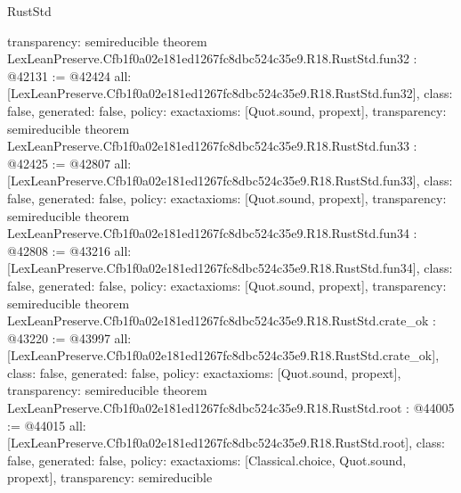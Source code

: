 \begin{lexlean}{RustStd}
\begin{coremodule}
{  transparency: semireducible
}
theorem LexLeanPreserve.Cfb1f0a02e181ed1267fc8dbc524c35e9.R18.RustStd.fun32 : @42131 := @42424 {
  all: [LexLeanPreserve.Cfb1f0a02e181ed1267fc8dbc524c35e9.R18.RustStd.fun32],
  class: false,
  generated: false,
  policy: exact{axioms: [Quot.sound, propext]},
  transparency: semireducible
}
theorem LexLeanPreserve.Cfb1f0a02e181ed1267fc8dbc524c35e9.R18.RustStd.fun33 : @42425 := @42807 {
  all: [LexLeanPreserve.Cfb1f0a02e181ed1267fc8dbc524c35e9.R18.RustStd.fun33],
  class: false,
  generated: false,
  policy: exact{axioms: [Quot.sound, propext]},
  transparency: semireducible
}
theorem LexLeanPreserve.Cfb1f0a02e181ed1267fc8dbc524c35e9.R18.RustStd.fun34 : @42808 := @43216 {
  all: [LexLeanPreserve.Cfb1f0a02e181ed1267fc8dbc524c35e9.R18.RustStd.fun34],
  class: false,
  generated: false,
  policy: exact{axioms: [Quot.sound, propext]},
  transparency: semireducible
}
theorem LexLeanPreserve.Cfb1f0a02e181ed1267fc8dbc524c35e9.R18.RustStd.crate_ok : @43220 := @43997 {
  all: [LexLeanPreserve.Cfb1f0a02e181ed1267fc8dbc524c35e9.R18.RustStd.crate_ok],
  class: false,
  generated: false,
  policy: exact{axioms: [Quot.sound, propext]},
  transparency: semireducible
}
theorem LexLeanPreserve.Cfb1f0a02e181ed1267fc8dbc524c35e9.R18.RustStd.root : @44005 := @44015 {
  all: [LexLeanPreserve.Cfb1f0a02e181ed1267fc8dbc524c35e9.R18.RustStd.root],
  class: false,
  generated: false,
  policy: exact{axioms: [Classical.choice, Quot.sound, propext]},
  transparency: semireducible
}


\end{coremodule}
\end{lexlean}
